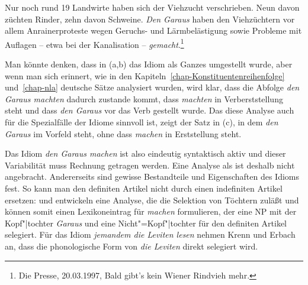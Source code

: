 \ex Nur noch rund 19 Landwirte haben sich der Viehzucht verschrieben. Neun davon züchten Rinder, zehn davon Schweine. 
\emph{Den Garaus} haben den Viehzüchtern vor allem Anrainerproteste wegen Geruchs- und Lärmbelästigung sowie Probleme mit Auflagen -- etwa bei der Kanalisation -- \emph{gemacht}.\footnote{
Die Presse, 20.03.1997, Bald gibt's kein Wiener Rindvieh mehr. %
}



\zl
Man könnte denken, dass in (a,b) das Idiom als Ganzes umgestellt wurde, aber wenn man sich
erinnert, wie in den Kapiteln~\ref{chap-Konstituentenreihenfolge} und~\ref{chap-nla} deutsche Sätze
analysiert wurden, wird klar, dass die Abfolge \emph{den Garaus machten} dadurch zustande kommt, dass
\emph{machten} in Verberststellung steht und dass \emph{den Garaus} vor das Verb gestellt wurde. Das diese
Analyse auch für die Spezialfälle der Idiome sinnvoll ist, zeigt der Satz in (c), in dem
\emph{den Garaus} im Vorfeld steht, ohne dass \emph{machen} in Erststellung steht.

Das Idiom \emph{den Garaus machen} ist also eindeutig syntaktisch aktiv und dieser Variabilität muss
Rechnung getragen werden. Eine Analyse als \vnull ist deshalb nicht angebracht. Andererseits
sind gewisse Bestandteile und Eigenschaften des Idioms fest. So kann man \zb den definiten Artikel nicht durch einen
indefiniten Artikel ersetzen:
\z
\citet{Erbach92a} und \citet{KE94a} entwickeln eine Analyse, die die Selektion von Töchtern zuläßt und können
somit einen Lexikoneintrag für \emph{machen} formulieren, der eine NP mit der Kopf"|tochter \emph{Garaus}
und eine Nicht"=Kopf"|tochter für den definiten Artikel selegiert. Für das Idiom \emph{jemandem die Leviten
lesen} nehmen Krenn und Erbach an, dass die phonologische Form von \emph{die Leviten} direkt selegiert
wird.

